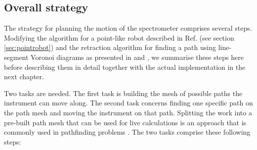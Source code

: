 \subsection{Overall strategy}
\label{sec:strategy}

The strategy for planning the motion of the spectrometer comprises several steps. 
Modifying the algorithm for a point-like robot described in Ref. 
\cite[Ch. 13, pp. 283-306]{Berg2008} (see section \ref{sec:pointrobot}) and the 
retraction algorithm for finding a path using line-segment Voronoi diagrams as 
presented in \cite[p. 163]{Berg2008} and \cite[Ch. 5.4.3, pp. 247-251]{FUH_geo2020}, we
summarise these steps here before describing them in detail together with the actual
implementation in the next chapter.

Two tasks are needed. The first task is building the mesh of possible paths the 
instrument can move along. 
The second task concerns finding one specific path on the path mesh and moving
the instrument on that path. 
Splitting the work into a pre-built path mesh that can be used for live calculations
is an approach that is commonly used in pathfinding problems \cite{Hwang2003, Choset2010_ch5}.
The two tasks comprise these following steps:
